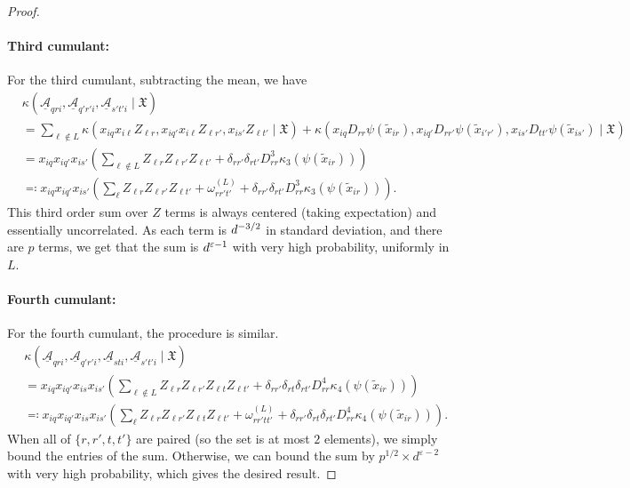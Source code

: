 \documentclass[letterpaper, 10pt, dvipsnames]{article}
\numberwithin{equation}{section}
\newcommand{\Au}{\underline{\mathcal{A}}}
\newcommand{\wt}{\widetilde}
\let\O\relax
\newcommand{\O}[1]{\mathcal{O}\left(#1\right)}
\theoremstyle{definition}
\begin{document}
\begin{proof}
  \paragraph{Third cumulant:} For the third cumulant, subtracting the mean, we have 
  \[
  \begin{aligned}
  &\kappa( \Au_{qri},\Au_{q'r'i},\Au_{s't'i} \mid \mathfrak{X}) \\
  &=
  \sum_{\ell \notin L} \kappa( x_{iq}x_{i\ell}Z_{\ell r}, x_{iq'}x_{i\ell}Z_{\ell r'}, x_{is'}Z_{\ell t'} \mid \mathfrak{X}) + \kappa(x_{iq}D_{rr}\psi(\wt{x}_{ir}), x_{iq'}D_{rr'}\psi(\wt{x}_{i'r'}), x_{is'}D_{tt'}\psi(\wt{x}_{is'}) \mid \mathfrak{X}) \\ 
  &= x_{iq}x_{iq'}x_{is'} \left( 
    \sum_{\ell \notin L} Z_{\ell r}Z_{\ell r'}  Z_{\ell t'} 
    +
  \delta_{r r'}\delta_{r t'} D_{rr}^3 \kappa_3(\psi(\wt{x}_{ir}))\right) \\
  &\eqqcolon x_{iq}x_{iq'}x_{is'} 
  \left( 
    \sum_{\ell} Z_{\ell r}Z_{\ell r'}  Z_{\ell t'} 
    + \omega^{(L)}_{rr't'}
    + \delta_{r r'}\delta_{r t'} D_{rr}^3 \kappa_3(\psi(\wt{x}_{ir}))
  \right).
  \end{aligned}
  \]
  This third order sum over $Z$ terms is always centered (taking expectation) and essentially uncorrelated.  As each term is $\O{d^{-3/2}}$ in standard deviation, and there are $p$ terms, we get that the sum is $\O{d^{\varepsilon-1}}$ with very high probability, uniformly in $L$.

  \paragraph{Fourth cumulant:} For the fourth cumulant, the procedure is similar. 
  \[
    \begin{aligned}
    &\kappa( \Au_{qri},\Au_{q'r'i},\Au_{sti},\Au_{s't'i} \mid \mathfrak{X}) \\
    &= x_{iq}x_{iq'}x_{is}x_{is'} \left( 
      \sum_{\ell \notin L} Z_{\ell r}Z_{\ell r'}   Z_{\ell t}Z_{\ell t'} 
      +\delta_{r r'}\delta_{r t} \delta_{r t'} D_{rr}^4 \kappa_4(\psi(\wt{x}_{ir}))
    \right) \\
    &\eqqcolon x_{iq}x_{iq'}x_{is}x_{is'} \left( 
      \sum_{\ell} Z_{\ell r}Z_{\ell r'}   Z_{\ell t} Z_{\ell t'}
      +\omega^{(L)}_{rr'tt'}
      +\delta_{r r'}\delta_{r t} \delta_{r t'} D_{rr}^4 \kappa_4(\psi(\wt{x}_{ir}))
    \right).
    \end{aligned}
  \]
  When all of $\{r,r',t,t'\}$ are paired (so the set is at most $2$ elements), we simply bound the entries of the sum.  Otherwise, we can bound the sum by $p^{1/2} \times d^{\varepsilon-2}$ with very high probability, which gives the desired result.

\end{proof}
\end{document}
